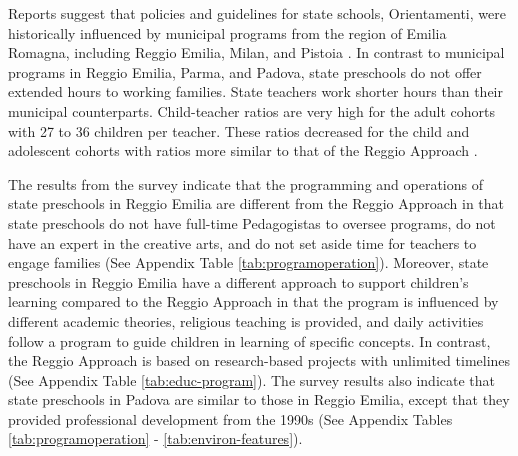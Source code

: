 %

Reports suggest that policies and guidelines for state schools, Orientamenti, were historically influenced by municipal programs from the region of Emilia Romagna, including Reggio Emilia, Milan, and Pistoia \citep{OECD_2001_Italy-Country-Note}. In contrast to municipal programs in Reggio Emilia, Parma, and Padova, state preschools do not offer extended hours to working families. State teachers work shorter hours than their municipal counterparts. Child-teacher ratios are very high for the adult cohorts with 27 to 36 children per teacher. These ratios decreased for the child and adolescent cohorts with ratios more similar to that of the Reggio Approach \citep{Hohnerlein_2015_Development-and-Diffusion}. 


The results from the survey indicate that the programming and operations of state preschools in Reggio Emilia are different from the Reggio Approach in that state preschools do not have full-time Pedagogistas to oversee programs, do not have an expert in the creative arts, and do not set aside time for teachers to engage families (See Appendix Table \ref{tab:programoperation}). Moreover, state preschools in Reggio Emilia have a different approach to support children's learning compared to the Reggio Approach in that the program is  influenced by different academic theories, religious teaching is provided, and daily activities follow a program to guide children in learning of specific concepts. In contrast, the Reggio Approach is based on research-based projects with unlimited timelines (See Appendix Table \ref{tab:educ-program}). The survey results also indicate that state preschools in Padova are similar to those in Reggio Emilia, except that they provided professional development from the 1990s (See Appendix Tables \ref{tab:programoperation} - \ref{tab:environ-features}).

